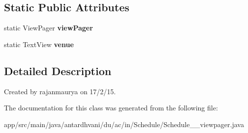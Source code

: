 \subsection*{Static Public Attributes}
\begin{DoxyCompactItemize}
\item 
\hypertarget{classantardhvani_1_1du_1_1ac_1_1in_1_1_schedule_1_1_schedule__22__viewpager_a9a7f3057ff8de75ad1d5a9065582780a}{}static View\+Pager {\bfseries view\+Pager}\label{classantardhvani_1_1du_1_1ac_1_1in_1_1_schedule_1_1_schedule__22__viewpager_a9a7f3057ff8de75ad1d5a9065582780a}

\item 
\hypertarget{classantardhvani_1_1du_1_1ac_1_1in_1_1_schedule_1_1_schedule__22__viewpager_ae16a1717019cc568297ce437511aa615}{}static Text\+View {\bfseries venue}\label{classantardhvani_1_1du_1_1ac_1_1in_1_1_schedule_1_1_schedule__22__viewpager_ae16a1717019cc568297ce437511aa615}

\end{DoxyCompactItemize}


\subsection{Detailed Description}
Created by rajanmaurya on 17/2/15. 

The documentation for this class was generated from the following file\+:\begin{DoxyCompactItemize}
\item 
app/src/main/java/antardhvani/du/ac/in/\+Schedule/Schedule\+\_\+\_\+viewpager.\+java\end{DoxyCompactItemize}
